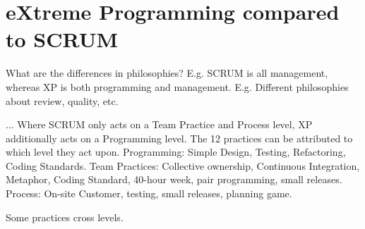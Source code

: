 \section{eXtreme Programming compared to SCRUM}
What are the differences in philosophies?
E.g. SCRUM is all management, whereas XP is both programming and management.
E.g. Different philosophies about review, quality, etc.






...
Where SCRUM only acts on a Team Practice and Process level, XP additionally acts on a Programming level.
The 12 practices can be attributed to which level they act upon.
Programming: Simple Design, Testing, Refactoring, Coding Standards.
Team Practices: Collective ownership, Continuous Integration, Metaphor, Coding Standard, 40-hour week, pair programming, small releases.
Process: On-site Customer, testing, small releases, planning game.

Some practices cross levels.